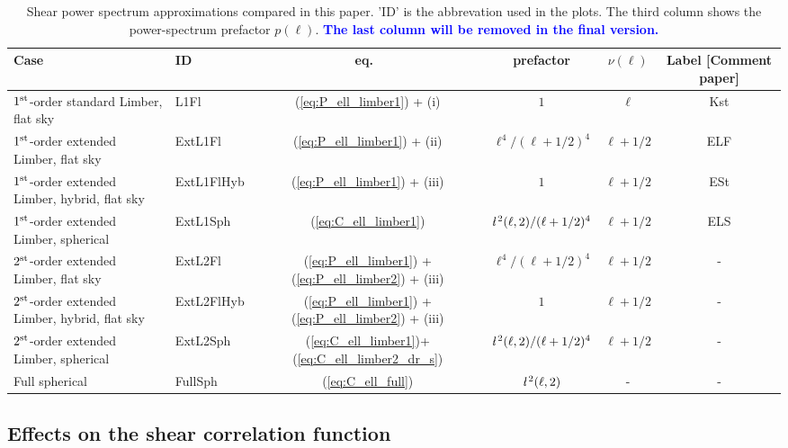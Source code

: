 \documentclass[fleqn,usenatbib]{mnras} %
\newcommand{\ellbar}{\hbox{\it \l}\,}
\newcommand{\mk}[1]{{\bf\textcolor{blue}{#1}}}
\begin{document}
\renewcommand{\baselinestretch}{1.3}
\begin{table}

  \label{tab:cases}

  \caption{Shear power spectrum approximations compared in this paper. 'ID' is the abbrevation used in the plots.
    The third column shows the power-spectrum prefactor $p(\ell)$.  \mk{The last column will be removed in the
        final version.}}

  \begin{tabular}{|l|l|c|c|c|c}
  \hline
  Case & ID & eq.~ & prefactor & $\nu(\ell)$ & Label [Comment paper] \\ \hline
  $1^{\rm st}$-order standard Limber, flat sky & L1Fl & (\ref{eq:P_ell_limber1}) + (i)
    & $1$ & $\ell$ & Kst \\ \hline
  $1^{\rm st}$-order extended Limber, flat sky & ExtL1Fl & (\ref{eq:P_ell_limber1}) + (ii)
    & $\ell^4/(\ell+1/2)^4$ & $\ell + 1/2$ & ELF \\ \hline
  $1^{\rm st}$-order extended Limber, hybrid, flat sky & ExtL1FlHyb & (\ref{eq:P_ell_limber1}) + (iii)
    & $1$ & $\ell + 1/2$ & ESt \\ \hline
  $1^{\rm st}$-order extended Limber, spherical & ExtL1Sph & (\ref{eq:C_ell_limber1})
    & $\ellbar^2(\ell, 2)/(\ell+1/2)^4$ & $\ell+1/2$ & ELS \\ \hline
  $2^{\rm st}$-order extended Limber, flat sky & ExtL2Fl &  (\ref{eq:P_ell_limber1}) + (\ref{eq:P_ell_limber2}) + (iii)
    & $\ell^4/(\ell+1/2)^4$ 
    & $\ell+1/2$ & - \\ \hline
  $2^{\rm st}$-order extended Limber, hybrid, flat sky & ExtL2FlHyb &  (\ref{eq:P_ell_limber1}) + (\ref{eq:P_ell_limber2}) + (iii)
    & $1$ 
    & $\ell+1/2$ & - \\ \hline
  $2^{\rm st}$-order extended Limber, spherical & ExtL2Sph & (\ref{eq:C_ell_limber1})+(\ref{eq:C_ell_limber2_dr_s})
    & $\ellbar^2(\ell, 2)/(\ell+1/2)^4$ & $\ell+1/2$ & - \\ \hline
  Full spherical & FullSph & (\ref{eq:C_ell_full}) &
      $\ellbar^2(\ell, 2)$ & - & - \\ \hline
  \end{tabular}

\end{table}
\renewcommand{\baselinestretch}{1}

\subsection{Effects on the shear correlation function}
\label{sec:comp_xi}
\end{document}
